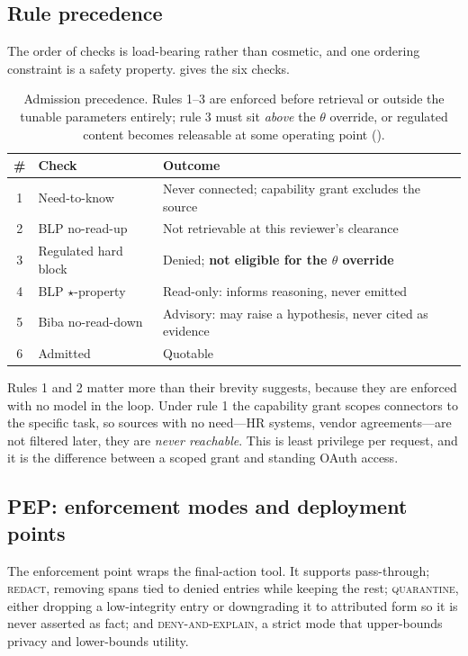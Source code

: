 \documentclass[conference,compsoc]{IEEEtran}
\begin{document}
\subsection{Rule precedence}
\label{sec:method:precedence}

The order of checks is load-bearing rather than cosmetic, and one ordering
constraint is a safety property.  gives the six checks.

\begin{table}[t]
\centering
\caption{Admission precedence. Rules 1--3 are enforced before retrieval or
outside the tunable parameters entirely; rule 3 must sit \emph{above} the
$\theta$ override, or regulated content becomes releasable at some operating
point ().}
\label{tab:precedence}
\footnotesize
\begin{tabular}{@{}clp{}@{}}
\toprule
\# & \textbf{Check} & \textbf{Outcome} \\
\midrule
1 & Need-to-know & Never connected; capability grant excludes the source \\
2 & BLP no-read-up & Not retrievable at this reviewer's clearance \\
3 & Regulated hard block & Denied; \textbf{not eligible for the $\theta$ override} \\
4 & BLP $\star$-property & Read-only: informs reasoning, never emitted \\
5 & Biba no-read-down & Advisory: may raise a hypothesis, never cited as evidence \\
6 & Admitted & Quotable \\
\bottomrule
\end{tabular}
\end{table}

Rules 1 and 2 matter more than their brevity suggests, because they are
enforced with no model in the loop. Under rule 1 the capability grant scopes
connectors to the specific task, so sources with no need---HR systems, vendor
agreements---are not filtered later, they are \emph{never reachable}. This is
least privilege per request, and it is the difference between a scoped grant
and standing OAuth access.

\subsection{PEP: enforcement modes and deployment points}
\label{sec:method:pep}

The enforcement point wraps the final-action tool. It supports pass-through;
\textsc{redact}, removing spans tied to denied entries while keeping the rest;
\textsc{quarantine}, either dropping a low-integrity entry or downgrading it to
attributed form so it is never asserted as fact; and \textsc{deny-and-explain},
a strict mode that upper-bounds privacy and lower-bounds utility.
\end{document}
